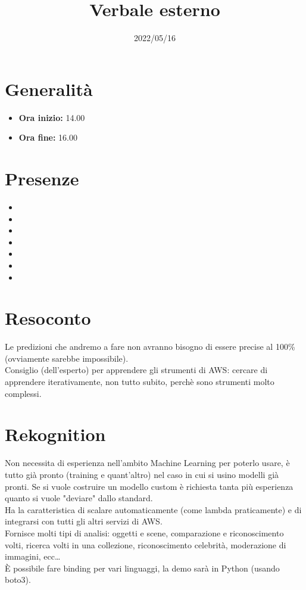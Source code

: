 \documentclass{classes/base}
\title{Verbale esterno}
\date{2022/05/16}
\author{\marcob}
\renewcommand{\maketitle}{
    
}
\begin{document}
    \maketitle

    \section*{Generalità}
    \begin{itemize}
        \item \textbf{Ora inizio:} 14.00
        \item \textbf{Ora fine:} 16.00
    \end{itemize}

    \section*{Presenze}
    \begin{itemize}
     	\item \angela
      	\item \marcob
        \item \tommaso
        \item \ruth
        \item \matteo
        \item \marcov
        \item \giulio

    \end{itemize}

    \section*{Resoconto}
    Le predizioni che andremo a fare non avranno bisogno di essere precise al 100\% (ovviamente sarebbe impossibile).\\
    Consiglio (dell'esperto) per apprendere gli strumenti di AWS: cercare di apprendere iterativamente, non tutto subito, perchè sono strumenti molto complessi.\\

    \section*{Rekognition}
    Non necessita di esperienza nell'ambito Machine Learning per poterlo usare, è tutto già pronto (training e quant'altro) nel caso in cui si usino modelli già pronti.
    Se si vuole costruire un modello custom è richiesta tanta più esperienza quanto si vuole "deviare" dallo standard.\\
    Ha la caratteristica di scalare automaticamente (come lambda praticamente) e di integrarsi con tutti gli altri servizi di AWS.\\
    Fornisce molti tipi di analisi: oggetti e scene, comparazione e riconoscimento volti, ricerca volti in una collezione, riconoscimento celebrità, moderazione di immagini, ecc… \\
    È possibile fare binding per vari linguaggi, la demo sarà in Python (usando boto3).
\end{document}
